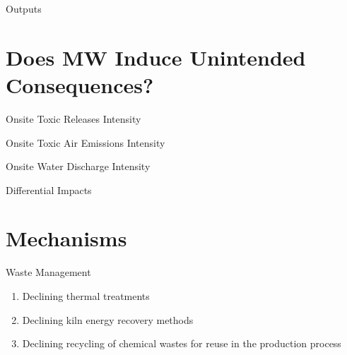 \documentclass[aspectratio = 169]{beamer}
\begin{document}
    \begin{frame}[shrink = 30]{Outputs}
        
        \hypertarget{Outputs}{}
        \hyperlink{tab:baseline-outputs}{}
    \end{frame}


    \section{Does MW Induce Unintended Consequences?}\label{sec:consequences}
    \begin{frame}{Onsite Toxic Releases Intensity}
        
        \hypertarget{Toxic Releases Intensity}{}
        \hyperlink{tab:toxic-releases-intensity}{}
    \end{frame}

    \begin{frame}[shrink = 10]{Onsite Toxic Air Emissions Intensity}
        
        \hypertarget{Toxic Air Emissions Intensity}{}
        \hyperlink{tab:toxic-air-emissions-intensity}{}
    \end{frame}

    \begin{frame}[shrink = 20]{Onsite Water Discharge Intensity}
        
        \hypertarget{Toxic Water Discharge Intensity}{}
        \hyperlink{tab:toxic-water-discharge-intensity}{}
    \end{frame}

    \begin{frame}[shrink = 30]{Differential Impacts}
        
        \hypertarget{Onsite Releases Intensities}{}
        \hyperlink{fig:heterogeneous-onsite-releases-int-heis}{}
    \end{frame}


    \section{Mechanisms}\label{sec:mechanisms}
    \begin{frame}{Waste Management}
        \begin{enumerate}
            \item Declining thermal treatments
            \item Declining kiln energy recovery methods
            \item Declining recycling of chemical wastes for reuse in the production process
        \end{enumerate}
        \hypertarget{Mechanism Waste Management}{}
        \hyperlink{tab:mechanism-waste-management}{}
    \end{frame}
\end{document}
